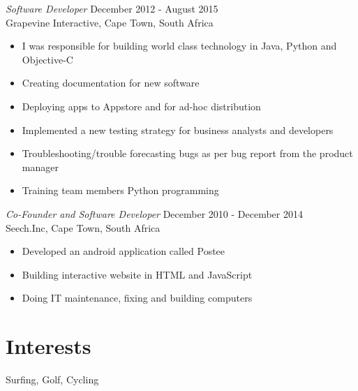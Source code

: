 \documentclass[margin, 10pt]{res} %
\begin{document}
\begin{resume}
 
{\sl Software Developer} \hfill December 2012 - August 2015\\
Grapevine Interactive, Cape Town, South Africa
\vspace{5mm} %
\begin{itemize} \itemsep -2pt %
\item I was responsible for building world class technology in Java, Python and Objective-C
\item Creating documentation for new software
\item Deploying apps to Appstore and for ad-hoc distribution 
\item Implemented a new testing strategy for business analysts and developers
\item Troubleshooting/trouble forecasting bugs as per bug report from the product manager
\item Training team members Python programming
\end{itemize}

 {\sl Co-Founder and Software Developer} \hfill December 2010 - December 2014\\
Seech.Inc, Cape Town, South Africa
\vspace{5mm} %
\begin{itemize} \itemsep -2pt %
\item Developed an android application called Postee
\item Building interactive website in HTML and JavaScript
\item Doing IT maintenance, fixing and building computers
\end{itemize} 



 

\section{Interests} 
Surfing, Golf, Cycling \\




 


\end{resume}
\end{document}
